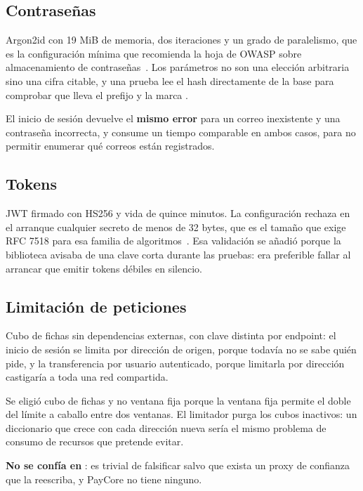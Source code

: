 \subsection{Contraseñas}

Argon2id con 19 MiB de memoria, dos iteraciones y un grado de paralelismo, que
es la configuración mínima que recomienda la hoja de OWASP sobre
almacenamiento de contraseñas~\cite{owasppwd}. Los parámetros no son una
elección arbitraria sino una cifra citable, y una prueba lee el hash
directamente de la base para comprobar que lleva el prefijo
 y la marca . 

El inicio de sesión devuelve el \textbf{mismo error} para un correo
inexistente y una contraseña incorrecta, y consume un tiempo comparable en
ambos casos, para no permitir enumerar qué correos están registrados.

\subsection{Tokens}

JWT firmado con HS256 y vida de quince minutos. La configuración rechaza en el
arranque cualquier secreto de menos de 32 bytes, que es el tamaño que exige
RFC 7518 para esa familia de algoritmos~\cite{rfc7518}. Esa validación se
añadió porque la biblioteca avisaba de una clave corta durante las pruebas:
era preferible fallar al arrancar que emitir tokens débiles en silencio.

\subsection{Limitación de peticiones}

Cubo de fichas sin dependencias externas, con clave distinta por endpoint: el
inicio de sesión se limita por dirección de origen, porque todavía no se sabe
quién pide, y la transferencia por usuario autenticado, porque limitarla por
dirección castigaría a toda una red compartida.

Se eligió cubo de fichas y no ventana fija porque la ventana fija permite el
doble del límite a caballo entre dos ventanas. El limitador purga los cubos
inactivos: un diccionario que crece con cada dirección nueva sería el mismo
problema de consumo de recursos que pretende evitar.

\textbf{No se confía en }: es trivial de falsificar
salvo que exista un proxy de confianza que la reescriba, y PayCore no tiene
ninguno.

